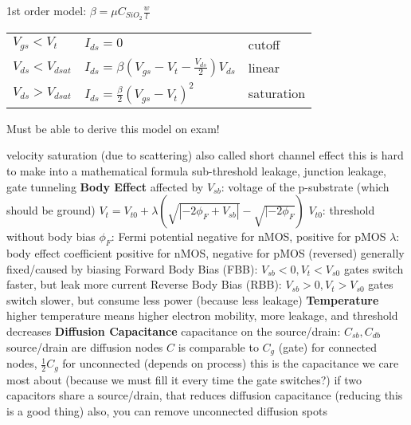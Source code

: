 \documentclass[12pt]{article}
\begin{document}
\begin{spacing}{0.8}
\begin{multicols*}{2}
\begin{flushleft}
\begin{outline}[longenum]
  \1 1st order model: $\beta=\mu C_{SiO_2}\frac{w}{l}$
  \begin{tabular}{l l l}
  $V_{gs} < V_t     $ & $I_{ds}=0$                                        & cutoff  \\
  $V_{ds} < V_{dsat}$ & $I_{ds}=\beta(V_{gs}-V_t-\frac{V_{ds}}{2})V_{ds}$ & linear \\
  $V_{ds} > V_{dsat}$ & $I_{ds}=\frac{\beta}{2}(V_{gs}-V_t)^2$            & saturation  \\
  \end{tabular}
  \1 Must be able to derive this model on exam!

  \1 velocity saturation (due to scattering)
    \2 also called short channel effect
    \2 this is hard to make into a mathematical formula
  \1 sub-threshold leakage, junction leakage, gate tunneling
  \1 \textbf{Body Effect}
    \2 affected by $V_{sb}$: voltage of the p-substrate (which should be ground)
    \2 $V_t=V_{t0}+\lambda(\sqrt{|-2\phi_F+V_{sb}|}-\sqrt{|-2\phi_F})$
      \3 $V_{t0}$: threshold without body bias
      \3 $\phi_F$: Fermi potential
        \4 negative for nMOS, positive for pMOS
      \3 $\lambda$: body effect coefficient
        \4 positive for nMOS, negative for pMOS (reversed)
    \2 generally fixed/caused by biasing
    \2 Forward Body Bias (FBB):
      \3 $V_{sb}<0, V_t<V_{s0}$
      \3 gates switch faster, but leak more current
    \2 Reverse Body Bias (RBB):
      \3 $V_{sb}>0, V_t>V_{s0}$
      \3 gates switch slower, but consume less power (because less leakage)
  \1 \textbf{Temperature}
    \2 higher temperature means higher electron mobility, more leakage, and threshold decreases
  \1 \textbf{Diffusion Capacitance}
    \2 capacitance on the source/drain: $C_{sb}, C_{db}$
      \3 source/drain are diffusion nodes
      \3 $C$ is comparable to $C_g$ (gate) for connected nodes, $\frac{1}{2}C_g$ for unconnected
      \3 (depends on process)
    \2 this is the capacitance we care most about (because we must fill it every time the gate switches?)
    \2 if two capacitors share a source/drain, that reduces diffusion capacitance (reducing this is a good thing)
    \2 also, you can remove unconnected diffusion spots






\end{outline}
\end{flushleft}
\end{multicols*}
\end{spacing}
\end{document}
